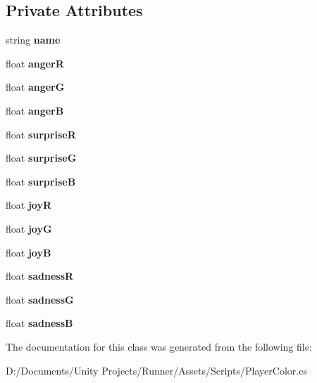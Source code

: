 \subsection*{Private Attributes}
\begin{DoxyCompactItemize}
\item 
\mbox{\label{class_player_color_a318d7b25e52cdc823e2e1c8cfbe1da1b}} 
string {\bfseries name}
\item 
\mbox{\label{class_player_color_a48b31417bc8e57f96fffeeddb6d7bd69}} 
float {\bfseries angerR}
\item 
\mbox{\label{class_player_color_a1ddc7f88503742e3723fb8f3b3fd56c1}} 
float {\bfseries angerG}
\item 
\mbox{\label{class_player_color_ae91d972857e7776825dc0ca9aa326ba6}} 
float {\bfseries angerB}
\item 
\mbox{\label{class_player_color_afd150e420df49e7560fbab24f561d1e2}} 
float {\bfseries surpriseR}
\item 
\mbox{\label{class_player_color_aa5ca40ae4329e6849f2a3c79059191eb}} 
float {\bfseries surpriseG}
\item 
\mbox{\label{class_player_color_ae353f178edd05fe85993f39a7c271471}} 
float {\bfseries surpriseB}
\item 
\mbox{\label{class_player_color_a6f1683e675f2090e1f759f81ad0ee78c}} 
float {\bfseries joyR}
\item 
\mbox{\label{class_player_color_a7d6e33b3f4b33fcfefe7de7ddb01bd9e}} 
float {\bfseries joyG}
\item 
\mbox{\label{class_player_color_a32f26e4022bfdcb7148b753ed01db0f1}} 
float {\bfseries joyB}
\item 
\mbox{\label{class_player_color_a2cb6523c32dcae8bef4dee365940011a}} 
float {\bfseries sadnessR}
\item 
\mbox{\label{class_player_color_a1caa8b653b888584100fc31ef7f8dd8e}} 
float {\bfseries sadnessG}
\item 
\mbox{\label{class_player_color_ada26af86bb887b1056c5f28040632fdd}} 
float {\bfseries sadnessB}
\end{DoxyCompactItemize}


The documentation for this class was generated from the following file\+:\begin{DoxyCompactItemize}
\item 
D\+:/\+Documents/\+Unity Projects/\+Runner/\+Assets/\+Scripts/Player\+Color.\+cs\end{DoxyCompactItemize}
